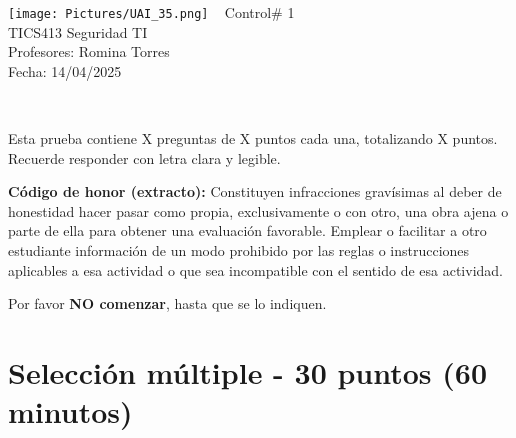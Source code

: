 \documentclass[a4paper]{article}
\begin{document}
\begin{center}
    \vspace*{-2cm}
    \texttt{[image: Pictures/UAI\_35.png]} \
    \vspace{0.5cm} %
    Control\# 1 \\
    TICS413 Seguridad TI \\
    Profesores: Romina Torres \\
    Fecha: 14/04/2025
\end{center}

\vspace{0.6cm}

\begin{flushleft}
     \\
    \medskip
\end{flushleft}
Esta prueba contiene X preguntas de X puntos cada una,  totalizando X puntos. Recuerde responder con letra clara y legible.


\textbf{Código de honor (extracto):} Constituyen infracciones gravísimas al deber de honestidad hacer pasar como propia, exclusivamente o con otro, una obra ajena o parte de ella para obtener una evaluación favorable. Emplear o facilitar a otro estudiante información de un modo prohibido por las reglas o instrucciones aplicables a esa actividad o que sea incompatible con el sentido de esa actividad.

Por favor \textbf{NO comenzar}, hasta que se lo indiquen.


\section*{Selección múltiple - 30 puntos (60 minutos)}
\end{document}
